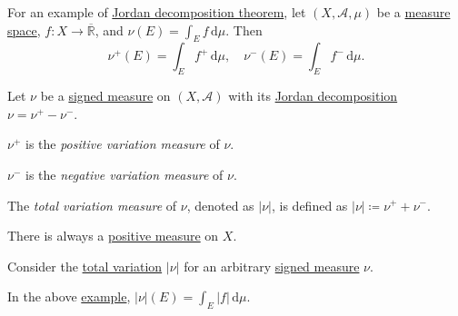 \begin{eg}\label{eg:lec30}
	For an example of \hyperref[thm:Jordan-decomposition]{Jordan decomposition theorem}, let \((X, \mathcal{A}, \mu)\) be a \hyperref[def:measure-space]{measure space}, \(f \colon X \to \overline{\mathbb{R}}\), and \(\nu(E) = \int_E f \,\mathrm{d} \mu\). Then
	\[
		\nu^+(E) = \int_E f^+ \,\mathrm{d} \mu,\quad \nu^-(E) = \int_E f^- \,\mathrm{d} \mu.
	\]
\end{eg}

\begin{definition*}
	Let \(\nu \) be a \hyperref[def:signed-measure]{signed measure} on \((X, \mathcal{A} )\) with its \hyperref[thm:Jordan-decomposition]{Jordan decomposition} \(\nu = \nu ^+ - \nu ^-\).

	\begin{definition}\label{def:positive-variation-measure}
		\(\nu ^+\) is the \emph{positive variation measure} of \(\nu \).
	\end{definition}

	\begin{definition}\label{def:negative-variation-measure}
		\(\nu ^-\) is the \emph{negative variation measure} of \(\nu \).
	\end{definition}

	\begin{definition}\label{def:total-variation}
		The \emph{total variation measure} of \(\nu\), denoted as \(\left\vert \nu \right\vert \), is defined as \(\left\vert \nu \right\vert \coloneqq \nu^+ + \nu^-\).
	\end{definition}
\end{definition*}

\begin{remark}
	There is always a \hyperref[def:signed-measure]{positive measure} on \(X\).
\end{remark}
\begin{explanation}
	Consider the \hyperref[def:total-variation]{total variation} \(\left\vert \nu \right\vert \) for an arbitrary \hyperref[def:signed-measure]{signed measure} \(\nu \).
\end{explanation}

\begin{eg}
	In the above \hyperref[eg:lec30]{example}, \(\left\vert \nu \right\vert (E) = \int_E \left\vert f \right\vert \,\mathrm{d} \mu\).
\end{eg}

